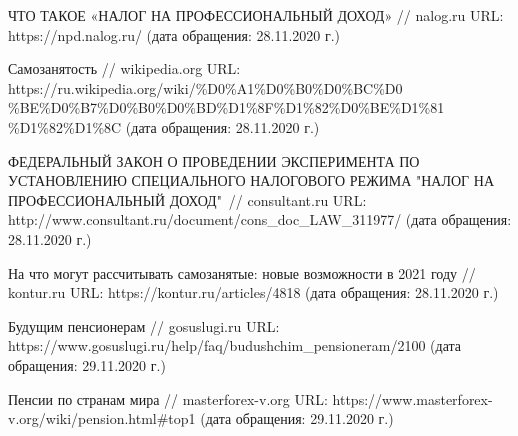 
\begin{thebibliography}{9} 
	ЧТО ТАКОЕ «НАЛОГ НА ПРОФЕССИОНАЛЬНЫЙ ДОХОД»	
	// nalog.ru
	URL: https://npd.nalog.ru/ 
	(дата обращения: 28.11.2020 г.)
	
	Самозанятость 
	// wikipedia.org 
	URL: https://ru.wikipedia.org/wiki/\%D0\%A1\%D0\%B0\%D0\%BC\%D0
	\%BE\%D0\%B7\%D0\%B0\%D0\%BD\%D1\%8F\%D1\%82\%D0\%BE\%D1\%81
	\%D1\%82\%D1\%8C
	(дата обращения: 28.11.2020 г.)
	
	ФЕДЕРАЛЬНЫЙ ЗАКОН
	О ПРОВЕДЕНИИ
	ЭКСПЕРИМЕНТА ПО УСТАНОВЛЕНИЮ СПЕЦИАЛЬНОГО НАЛОГОВОГО
	РЕЖИМА "НАЛОГ НА ПРОФЕССИОНАЛЬНЫЙ ДОХОД"\ 
	// consultant.ru 
	URL: http://www.consultant.ru/document/cons\_doc\_LAW\_311977/
	(дата обращения: 28.11.2020 г.)
	
	На что могут рассчитывать самозанятые: новые возможности в 2021 году 
	// kontur.ru
	URL: https://kontur.ru/articles/4818
	(дата обращения: 28.11.2020 г.)
	
	Будущим пенсионерам
	// gosuslugi.ru
	URL: https://www.gosuslugi.ru/help/faq/budushchim\_pensioneram/2100
	(дата обращения: 29.11.2020 г.)
	
	Пенсии по странам мира
	// masterforex-v.org
	URL: https://www.masterforex-v.org/wiki/pension.html\#top1
	(дата обращения: 29.11.2020 г.)
\end{thebibliography}